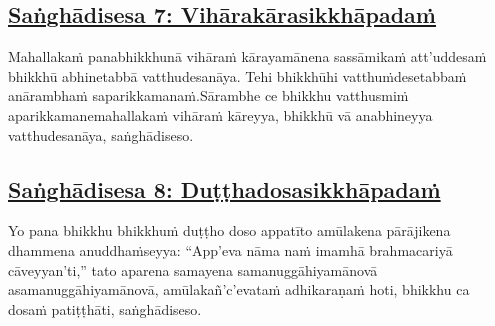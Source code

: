 \subsection*{\hyperref[comm7]{Saṅghādisesa 7: Vihārakārasikkhāpadaṁ}}
\label{sd7}

Mahallakaṁ pana\makeatletter\hyperlink{endnote55-appendix}\makeatother \thinspace bhikkhunā vihāraṁ kārayamānena sassāmikaṁ att'uddesaṁ bhikkhū abhinetabbā vatthudesanāya. Tehi bhikkhūhi vatthuṁ\makeatletter\hyperlink{endnote56-appendix}\makeatother \thinspace desetabbaṁ anārambhaṁ saparikkamanaṁ.\makeatletter\hyperlink{endnote57-appendix}\makeatother \thinspace Sārambhe ce bhikkhu vatthusmiṁ aparikkamane\makeatletter\hyperlink{endnote58-appendix}\makeatother \thinspace mahallakaṁ vihāraṁ kāreyya, bhikkhū vā anabhineyya vatthudesanāya, saṅghādiseso.



\subsection*{\hyperref[comm8]{Saṅghādisesa 8: Duṭṭhadosasikkhāpadaṁ}}
\label{sd8}

Yo pana bhikkhu bhikkhuṁ duṭṭho doso appatīto amūlakena pārājikena dhammena anuddhaṁseyya: ``App'eva nāma naṁ imamhā brahmacariyā cāveyyan'ti,'' tato aparena samayena samanuggāhiyamāno\makeatletter\hyperlink{endnote59-appendix}\makeatother \thinspace vā asamanuggāhiyamāno\makeatletter\hyperlink{endnote60-appendix}\makeatother \thinspace vā, amūlakañ'c'eva\makeatletter\hyperlink{endnote-appendix}\makeatother \thinspace taṁ adhikaraṇaṁ hoti, bhikkhu ca dosaṁ patiṭṭhāti, saṅghādiseso.




